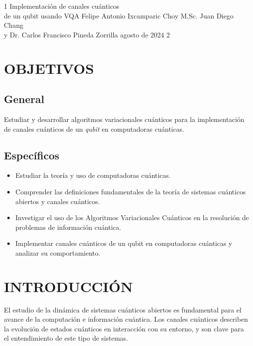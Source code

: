 \documentclass[letterpaper,12pt]{thesisECFM}
\theoremstyle{plain}
\theoremstyle{definition}
\theoremstyle{remark}
\newcommand{\1}{\mathbb{1}}
\begin{document}
\datosThesis%
{1}%
{Implementación de canales cuánticos \\ de un qubit usando VQA}%
{Felipe Antonio Ixcamparic Choy}%
{M.Sc. Juan Diego Chang\\y Dr. Carlos Francisco Pineda Zorrilla}%
{agosto de 2024}		%
{2}							%

\tableofcontents    %

\mainmatter
\chapter*{OBJETIVOS} %
\section*{General} 
Estudiar  y desarrollar algoritmos variacionales cuánticos para la implementación de canales cuánticos de un \textit{qubit} en computadoras cuánticas.

\section*{Específicos}
\begin{itemize}
    \item Estudiar la teoría y uso de computadoras cuánticas.
    \item Comprender las definiciones fundamentales de la teoría de sistemas cuánticos abiertos y canales cuánticos.
    \item Investigar el uso de los Algoritmos Variacionales Cuánticos en la resolución de problemas de información cuántica.
    \item Implementar canales cuánticos de un qubit en computadoras cuánticas y analizar su comportamiento.
\end{itemize}
\chapter*{INTRODUCCIÓN} %
El estudio de la dinámica de sistemas cuánticos abiertos es fundamental para el avance de la computación e información cuántica. Los canales cuánticos describen la evolución de estados cuánticos en  interacción con su entorno, y son clave para el entendimiento de este tipo de sistemas.
\end{document}
